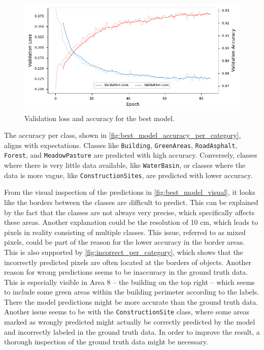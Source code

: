 \begin{figure}[H]
    \centering
    \captionsetup{width=0.8\linewidth}
    \includegraphics{figures/best_model_training_metrics.pdf}
    \caption{Validation loss and accuracy for the best model.}
    \label{fig:best_model_training_metrics}
\end{figure}

The accuracy per class, shown in \autoref{fig:best_model_accuracy_per_category},
aligns with expectations. Classes like \texttt{Building}, \texttt{GreenAreas}, \texttt{RoadAsphalt}, \texttt{Forest},
and \texttt{MeadowPasture} are predicted with high accuracy. Conversely, classes where there is
very little data available, like \texttt{WaterBasin}, or classes where the data is more vague,
like \texttt{ConstructionSites}, are predicted with lower accuracy.

From the visual inspection of the predictions in \autoref{fig:best_model_visual},  
it looks like the borders between the classes are difficult to predict. This can be  
explained by the fact that the classes are not always very precise, which specifically  
affects these areas. Another explanation could be the resolution of 10 cm,  
which leads to pixels in reality consisting of multiple classes. This issue, referred to  
as mixed pixels, could be part of the reason for the lower accuracy in the  
border areas. This is also supported by \autoref{fig:incorrect_per_category},  
which shows that the incorrectly predicted pixels are often located at the borders  
of objects. Another reason for wrong predictions seems to be inaccuracy in the  
ground truth data. This is especially visible in Area 8 -- the building on the  
top right -- which seems to include some green areas within the building perimeter according to the labels.  
There the model predictions might be more accurate than the ground truth data.  
Another issue seems to be with the \texttt{ConstructionSite} class, where some
areas marked as wrongly predicted might actually be correctly predicted by the model
and incorrectly labeled in the ground truth data. In order to improve the result, a thorough
inspection of the ground truth data might be necessary.

